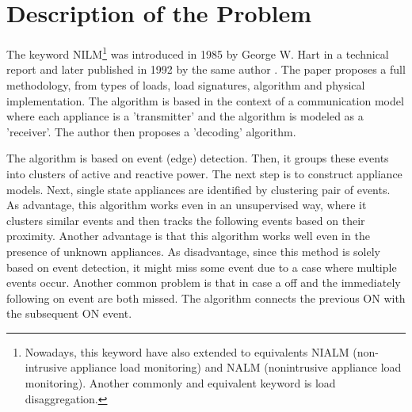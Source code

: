 \section{Description of the Problem}

The keyword NILM\footnote{Nowadays, this keyword have also extended to equivalents NIALM (non-intrusive appliance load monitoring) and NALM (nonintrusive appliance load monitoring). Another commonly and equivalent keyword is load disaggregation.} was introduced in 1985 by George W. Hart in a technical report \cite{hart85} and later published in 1992 by the same author \cite{hart}. The paper proposes a full methodology, from types of loads, load signatures, algorithm and physical implementation. The algorithm is based in the context of a communication model where each appliance is a 'transmitter' and the algorithm is modeled as a 'receiver'. The author then proposes a 'decoding'  algorithm. 

The algorithm is based on event (edge) detection. Then, it groups these events into clusters of active and reactive power. The next step is to construct appliance models. Next, single state appliances are identified by clustering pair of events. As advantage, this algorithm works even in an unsupervised way, where it clusters similar events and then tracks the following events based on their proximity. Another advantage is that this algorithm works well even in the presence of unknown appliances. As disadvantage, since this method is solely based on event detection, it might miss some event due to a case where multiple events occur. Another common problem is that in case a off and the immediately following on event are both missed. The algorithm connects the previous ON with the subsequent ON event. 

